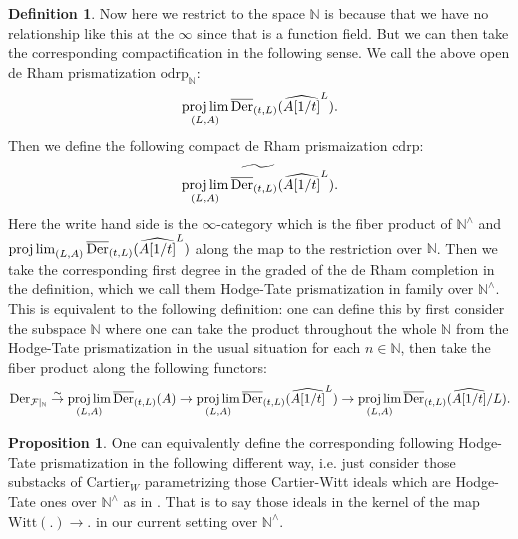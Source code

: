 \documentclass[12pt]{article}
\theoremstyle{definition}
\newtheorem{definition}{Definition}
\newtheorem{proposition}{Proposition}
\begin{document}
\begin{definition}
Now here we restrict to the space $\mathbb{N}$ is because that we have no relationship like this at the $\infty$ since that is a function field. But we can then take the corresponding compactification in the following sense. We call the above open de Rham prismatization $\mathrm{odrp}_\mathbb{N}$:
\begin{align}
\projlim_{(L,A)}\overline{\mathrm{Der}}_{(t,L)}(\widehat{A[1/t]}^{L}).
\end{align}
Then we define the following compact de Rham prismaization $\mathrm{cdrp}$:
\begin{align}
\widetilde{\projlim_{(L,A)}\overline{\mathrm{Der}}_{(t,L)}(\widehat{A[1/t]}^{L})}.
\end{align}
Here the write hand side is the $\infty$-category which is the fiber product of $\mathbb{N}^\wedge$ and $\projlim_{(L,A)}\overline{\mathrm{Der}}_{(t,L)}(\widehat{A[1/t]}^{L})$ along the map to the restriction over $\mathbb{N}$. Then we take the corresponding first degree in the graded of the de Rham completion in the definition, which we call them Hodge-Tate prismatization in family over $\mathbb{N}^\wedge$. This is equivalent to the following definition: one can define this by first consider the subspace $\mathbb{N}$ where one can take the product throughout the whole $\mathbb{N}$ from the Hodge-Tate prismatization in the usual situation for each $n\in \mathbb{N}$, then take the fiber product along the following functors:
\begin{align}
\mathrm{Der}_{\mathcal{F}|_{\mathbb{N}}}\overset{\sim}{\rightarrow} \projlim_{(L,A)}\overline{\mathrm{Der}}_{(t,L)}(A) \overset{}{\rightarrow} \projlim_{(L,A)}\overline{\mathrm{Der}}_{(t,L)}(\widehat{A[1/t]}^L) \overset{}{\rightarrow} \projlim_{(L,A)}\overline{\mathrm{Der}}_{(t,L)}(\widehat{A[1/t]}/L).
\end{align} 
\end{definition}


\begin{proposition}
One can equivalently define the corresponding following Hodge-Tate prismatization in the following different way, i.e. just consider those substacks of $\mathrm{Cartier}_{W}$ parametrizing those Cartier-Witt ideals which are Hodge-Tate ones over $\mathbb{N}^\wedge$ as in \cite{2BL}. That is to say those ideals in the kernel of the map $\mathrm{Witt}(.)\rightarrow .$ in our current setting over $\mathbb{N}^\wedge$.
\end{proposition}
\end{document}
